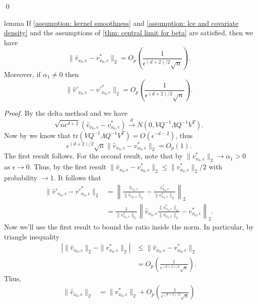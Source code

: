 \documentclass[11pt]{article}
\begin{document}
\qed{}

\begin{restatable}{lemma}{} \label{lemma: scaled high prob bound for velocity}
    If \cref{assumption: kernel smoothness} and \cref{assumption: lce and covariate density} and the assumptions of \cref{thm: central limit for beta} are satisfied, then we have 
    \[\|\hat{v}_{x_0, \epsilon} - v^*_{x_0, \epsilon}\|_2 = O_p\left(\frac{1}{\epsilon^{(d+2)/2}\sqrt{n}}\right).\]
    Moreover, if $\alpha_1 \neq 0$ then 
    \[\|\hat{v}'_{x_0, \epsilon} - v'^*_{x_0, \epsilon}\|_2 = O_p\left(\frac{1}{\epsilon^{(d+2)/2}\sqrt{n}}\right).\]
\end{restatable}
\noindent \textit{Proof.} By the delta method and  we have
\[\sqrt{n\epsilon^{d+2}}(\hat{v}_{x_0, \epsilon} - v^*_{x_0, \epsilon}) \overset{d}\rightarrow N(0, VQ^{-1}\Lambda Q^{-1}V^T). \]
Now by  we know that $\text{tr}(VQ^{-1}\Lambda Q^{-1}V^T) = O(\epsilon^{-d-2})$, thus
\[\epsilon^{(d+2)/2}\sqrt{n}\|\hat{v}_{x_0, \epsilon} - v^*_{x_0, \epsilon}\|_2 = O_p(1).\]
The first result follows. For the second result, note that by  $\|v^*_{x_0, \epsilon}\|_2 \rightarrow \alpha_1 > 0$ as $\epsilon \rightarrow 0$. Thus, by the first result $\|\hat{v}_{x_0, \epsilon} - v^*_{x_0, \epsilon}\|_2 \leq \|v^*_{x_0, \epsilon}\|_2/2$ with probability $\rightarrow 1$. It follows that 
\begin{align}
    \|\hat{v}'_{x_0, \epsilon} - v'^*_{x_0, \epsilon}\|_2 &= \left\|\frac{\hat{v}_{x_0, \epsilon}}{\|\hat{v}_{x_0, \epsilon}\|_2} - \frac{v^*_{x_0, \epsilon}}{\|v^*_{x_0, \epsilon}\|_2}\right\|_2 \\
    &= \frac{1}{\|v^*_{x_0, \epsilon}\|_2}\left\|\hat{v}_{x_0, \epsilon}\frac{\|v^*_{x_0, \epsilon}\|_2}{\|\hat{v}_{x_0, \epsilon}\|_2} - v^*_{x_0, \epsilon}\right\|_2.
\end{align}
Now we'll use the first result to bound the ratio inside the norm. In particular, by triangle inequality
\begin{align}
    \left|\|\hat{v}_{x_0, \epsilon}\|_2 - \|v^*_{x_0, \epsilon}\|_2\right| &\leq \|\hat{v}_{x_0, \epsilon} - v^*_{x_0, \epsilon}\|_2 \\
    &= O_p\left(\frac{1}{\epsilon^{(d+2)/2}\sqrt{n}}\right).
\end{align}
Thus,
\begin{align}
    \|\hat{v}_{x_0, \epsilon}\|_2 &= \|v^*_{x_0, \epsilon}\|_2 + O_p\left(\frac{1}{\epsilon^{(d+2)/2}\sqrt{n}}\right)
\end{align}
\end{document}
